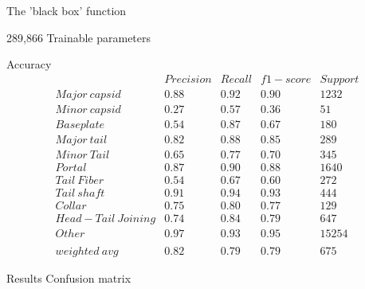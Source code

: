 \documentclass{beamer}
\begin{document}
\begin{frame}{The 'black box' function}
 \\
\begin{center}
289,866 Trainable parameters
\end{center}
\end{frame}

\begin{frame}{Accuracy}
$$
\begin{matrix}
 & Precision & Recall & f1-score & Support\\ 
Major\ capsid & 0.88 & 0.92 & 0.90 & 1232\\ 
Minor\ capsid & 0.27 & 0.57 & 0.36 & 51\\ 
Baseplate & 0.54 & 0.87 & 0.67 & 180\\ 
Major\ tail & 0.82 & 0.88 & 0.85 & 289\\ 
Minor\ Tail & 0.65 & 0.77 & 0.70 & 345\\ 
Portal & 0.87 & 0.90 & 0.88 & 1640\\ 
Tail\ Fiber & 0.54 & 0.67 & 0.60 & 272\\  
Tail\ shaft & 0.91 & 0.94 & 0.93 & 444\\ 
Collar & 0.75 & 0.80 & 0.77 & 129\\ 
Head-Tail\ Joining & 0.74 & 0.84 & 0.79 & 647\\
Other & 0.97 & 0.93 & 0.95 & 15254\\ 
 &  &  &  & \\ 
weighted\ avg & 0.82 & 0.79 & 0.79 & 675 
\end{matrix}
$$
\end{frame}



\begin{frame}{Results Confusion matrix}
\end{frame}
\end{document}

